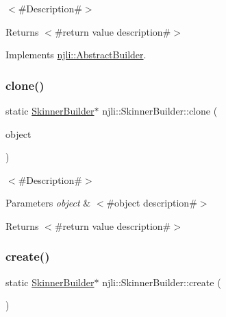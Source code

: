 $<$\#\+Description\#$>$

\begin{DoxyReturn}{Returns}
$<$\#return value description\#$>$ 
\end{DoxyReturn}


Implements \mbox{\hyperlink{classnjli_1_1_abstract_builder_aa1d220053e182c37b31b427499c6eacf}{njli\+::\+Abstract\+Builder}}.

\mbox{\label{classnjli_1_1_skinner_builder_ac90e72b4b4b29cf200e714b6639807eb}} 
\subsubsection{\texorpdfstring{clone()}{clone()}}
{\footnotesize\ttfamily static \mbox{\hyperlink{classnjli_1_1_skinner_builder}{Skinner\+Builder}}$\ast$ njli\+::\+Skinner\+Builder\+::clone (\begin{DoxyParamCaption}\item[{const \mbox{\hyperlink{classnjli_1_1_skinner_builder}{Skinner\+Builder}} \&}]{object }\end{DoxyParamCaption})\hspace{0.3cm}{\ttfamily [static]}}

$<$\#\+Description\#$>$


\begin{DoxyParams}{Parameters}
{\em object} & $<$\#object description\#$>$\\
\hline
\end{DoxyParams}
\begin{DoxyReturn}{Returns}
$<$\#return value description\#$>$ 
\end{DoxyReturn}
\mbox{\label{classnjli_1_1_skinner_builder_a23dec85823c098ba80e17b6e3a7f86b0}} 
\subsubsection{\texorpdfstring{create()}{create()}}
{\footnotesize\ttfamily static \mbox{\hyperlink{classnjli_1_1_skinner_builder}{Skinner\+Builder}}$\ast$ njli\+::\+Skinner\+Builder\+::create (\begin{DoxyParamCaption}{ }\end{DoxyParamCaption})\hspace{0.3cm}{\ttfamily [static]}}

